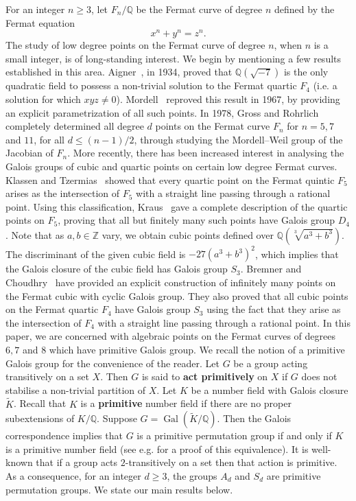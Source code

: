 \documentclass{amsart}
\theoremstyle{definition}
\newcommand{\Z}{\mathbb{Z}}
\newcommand{\Q}{\mathbb{Q}}
\DeclareMathOperator{\Gal}{Gal}
\begin{document}
For an integer $n\geq 3$, let $F_{n}/\Q$ be the Fermat curve of degree $n$ defined by the Fermat equation
\begin{equation}
    \label{eq:Fermat}
    x^n+y^n=z^n.
\end{equation}
The study of low degree points on the Fermat curve of degree $n$, when $n$ is a small integer, is of long-standing interest. We begin by mentioning a few results established in this area. Aigner~\cite{Aigner34}, in 1934, proved that $\Q(\sqrt{-7})$ is the only quadratic field to possess a non-trivial solution to the Fermat quartic $F_4$ (i.e. a solution for which $xyz\neq 0$). Mordell~\cite{Mo} reproved this result in 1967, by providing an explicit parametrization of all such points. In 1978, Gross and Rohrlich \cite{Rohrlich1978} completely determined all degree $d$ points on the Fermat curve $F_n$ for $n=5, 7 $ and $11$, for all $d\leq (n-1)/2$, through studying the Mordell--Weil group of the Jacobian of $F_n$. More recently, there has been increased interest in analysing the Galois groups of cubic and quartic points on certain low degree Fermat curves. Klassen and Tzermias~\cite{MatthewKlassen1997} showed that every quartic point on the Fermat quintic $F_5$ arises as the intersection of $F_5$ with a straight line passing through a rational point. 
Using this classification, Kraus~\cite{Kraus18} gave a complete description of the quartic points on $F_5$, proving that all but finitely many such points have Galois group $D_4$. Note that as $a,b\in \Z$ vary, we obtain cubic points defined over $\Q(\sqrt[3]{a^3+b^3})$. The discriminant of the given cubic field is $-27(a^3+b^3)^2$, which implies that the Galois closure of the cubic field has Galois group $S_3$. Bremner and Choudhry~\cite{BremnerChoudhry} have provided an explicit construction of infinitely many points on the Fermat cubic with cyclic Galois group. They also proved that all cubic points on the Fermat quartic $F_4$ have Galois group $S_3$ using the fact that they arise as the intersection of $F_4$ with a straight line passing through a rational point. In this paper, we are concerned with algebraic points on the Fermat curves of degrees $6, 7$ and $8$ which have primitive Galois group. We recall the notion of a primitive Galois group for the convenience of the reader. 
Let $G$ be a group acting transitively on a set $X$. Then $G$ is said to \textbf{act primitively} on $X$ if $G$ does not stabilise a non-trivial partition of $X$. Let $K$ be a number field with Galois closure $\tilde{K}$. Recall that $K$ is a \textbf{primitive} number field if there are no proper subextensions of $K/\Q$. Suppose $G=\Gal(\tilde{K}/\Q)$. Then the Galois correspondence implies that $G$ is a primitive permutation group if and only if $K$ is a primitive number field (see e.g. \cite[Lemma 28]{khawaja2023primitive} for a proof of this equivalence). 
It is well-known that if a group acts $2$-transitively on a set then that action is primitive. As a consequence, for an integer $d\geq 3$, the groups $A_d$ and $S_d$ are primitive permutation groups. We state our main results below.
\end{document}
